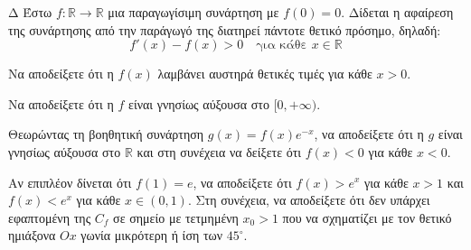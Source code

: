 \begin{thema}{Δ}
Έστω $f: \mathbb{R} \to \mathbb{R}$ μια παραγωγίσιμη συνάρτηση με $f(0)=0$. Δίδεται η αφαίρεση της συνάρτησης από την παράγωγό της διατηρεί πάντοτε θετικό πρόσημο, δηλαδή:
\[ f'(x) - f(x) > 0 \quad \text{για κάθε } x \in \mathbb{R} \]
\begin{erwthma}
    \item Να αποδείξετε ότι η $f(x)$ λαμβάνει αυστηρά θετικές τιμές για κάθε $x > 0$. 
    \item Να αποδείξετε ότι η $f$ είναι γνησίως αύξουσα στο $[0, +\infty)$. 
    \item Θεωρώντας τη βοηθητική συνάρτηση $g(x) = f(x) e^{-x}$, να αποδείξετε ότι η $g$ είναι γνησίως αύξουσα στο $\mathbb{R}$ και στη συνέχεια να δείξετε ότι $f(x) < 0$ για κάθε $x < 0$. 
    \item Αν επιπλέον δίνεται ότι $f(1) = e$, να αποδείξετε ότι $f(x) > e^x$ για κάθε $x > 1$ και $f(x) < e^x$ για κάθε $x \in (0, 1)$. Στη συνέχεια, να αποδείξετε ότι δεν υπάρχει εφαπτομένη της $C_f$ σε σημείο με τετμημένη $x_0 > 1$ που να σχηματίζει με τον θετικό ημιάξονα $Ox$ γωνία μικρότερη ή ίση των $45^\circ$. 
\end{erwthma}
\end{thema}
